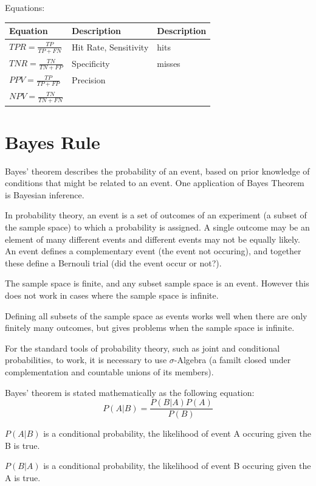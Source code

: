 \documentclass[11pt]{article}
\begin{document}
Equations:
\begin{center}
\begin{tabular}{lll}
Equation & Description & Description\\
\hline
\(TPR = \frac{TP}{TP+FN}\) & Hit Rate, Sensitivity & hits\\
\(TNR = \frac{TN}{TN+FP}\) & Specificity & misses\\
\(PPV = \frac{TP}{TP+FP}\) & Precision & \\
\(NPV = \frac{TN}{TN+FN}\) &  & \\
\end{tabular}
\end{center}

\section{Bayes Rule}
\label{sec:org0c3ae02}

Bayes' theorem describes the probability of an event, based on prior
knowledge of conditions that might be related to an event. One
application of Bayes Theorem is Bayesian inference. 

In probability theory, an event is a set of outcomes of an experiment
(a subset of the sample space) to which a probability is assigned. A
single outcome may be an element of many different events and
different events may not be equally likely. An event defines a
complementary event (the event not occuring), and together these
define a Bernouli trial (did the event occur or not?). 

The sample space is finite, and any subset sample space is an
event. However this does not work in cases where the sample space is
infinite. 

Defining all subsets of the sample space as events works well when
there are only finitely many outcomes, but gives problems when the
sample space is infinite. 

For the standard tools of probability theory, such as joint and
conditional probabilities, to work, it is necessary to use
\(\sigma\)-Algebra (a familt closed under complementation and countable
unions of its members). 

Bayes' theorem is stated mathematically as the following equation: 
$$P(A|B) = \frac{P(B|A)P(A)}{P(B)}$$

\(P(A|B)\) is a conditional probability, the likelihood of event A
occuring given the B is true.  

\(P(B|A)\) is a conditional probability, the likelihood of event B
occuring given the A is true.  
\end{document}
